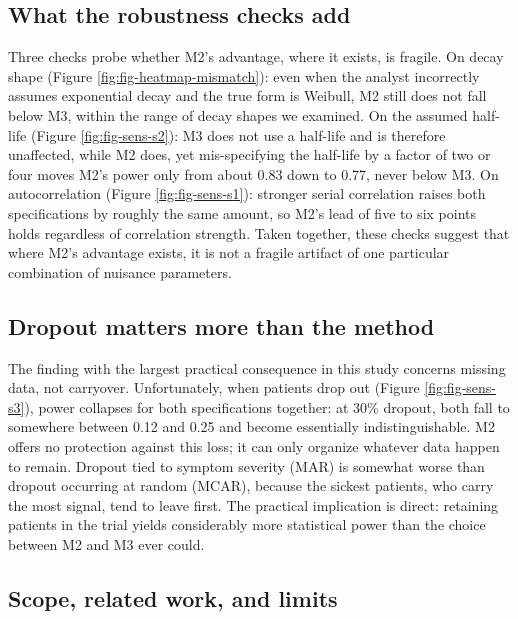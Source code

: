 \documentclass[
  11pt,
]{article}
\begin{document}
\subsection{What the robustness checks add}\label{what-the-robustness-checks-add}

Three checks probe whether M2's advantage, where it exists, is
fragile. On decay shape (Figure \ref{fig:fig-heatmap-mismatch}):
even when the analyst incorrectly assumes exponential decay and the
true form is Weibull, M2 still does not fall below M3, within the
range of decay shapes we examined. On the assumed half-life (Figure
\ref{fig:fig-sens-s2}): M3 does not use a half-life and is
therefore unaffected, while M2 does, yet mis-specifying the
half-life by a factor of two or four moves M2's power only from
about 0.83 down to 0.77, never below M3. On autocorrelation (Figure
\ref{fig:fig-sens-s1}): stronger serial correlation raises both
specifications by roughly the same amount, so M2's lead of five to
six points holds regardless of correlation strength. Taken together,
these checks suggest that where M2's advantage exists, it is not a
fragile artifact of one particular combination of nuisance
parameters.

\subsection{Dropout matters more than the method}\label{dropout-matters-more-than-the-method}

The finding with the largest practical consequence in this study
concerns missing data, not carryover. Unfortunately, when patients
drop out (Figure \ref{fig:fig-sens-s3}), power collapses for both
specifications together: at 30\% dropout, both fall to somewhere
between 0.12 and 0.25 and become essentially indistinguishable. M2
offers no protection against this loss; it can only organize
whatever data happen to remain. Dropout tied to symptom severity
(MAR) is somewhat worse than dropout occurring at random (MCAR),
because the sickest patients, who carry the most signal, tend to
leave first. The practical implication is direct: retaining patients
in the trial yields considerably more statistical power than the
choice between M2 and M3 ever could.

\subsection{Scope, related work, and limits}\label{scope-related-work-and-limits}
\end{document}
